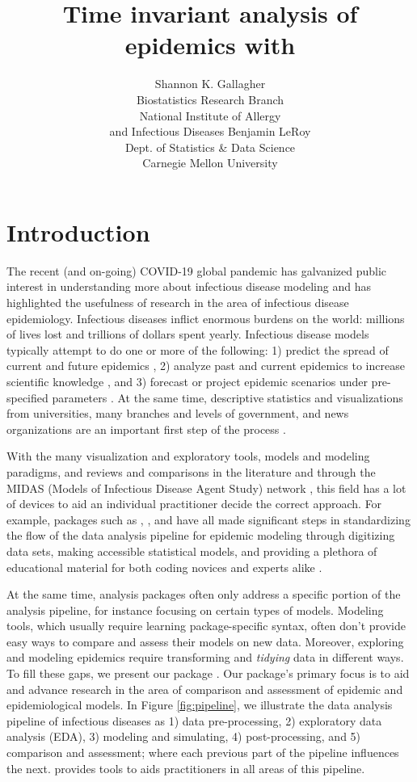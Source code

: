 \documentclass[
  shortnames]{jss}
\author{
Shannon K. Gallagher\\Biostatistics Research Branch\\
National Institute of Allergy\\
and Infectious Diseases \And Benjamin LeRoy\\Dept. of Statistics \& Data Science\\
Carnegie Mellon University
}
\title{Time invariant analysis of epidemics with \pkg{EpiCompare}}
\begin{document}
\newcommand{\shannon}[1]{\textcolor{orange}{#1}}
\newcommand{\ben}[1]{\textcolor{violet}{#1}}

\newtheorem{theorem}{Theorem}

\section[Intro]{Introduction}\label{sec:intro}

The recent (and on-going) COVID-19 global pandemic has galvanized public
interest in understanding more about infectious disease modeling and has
highlighted the usefulness of research in the area of infectious disease
epidemiology. Infectious diseases inflict enormous burdens on the world:
millions of lives lost and trillions of dollars spent yearly. Infectious
disease models typically attempt to do one or more of the following: 1)
predict the spread of current and future epidemics
\citep[e.g. flu prediction][]{Biggerstaff2016}, 2) analyze past and
current epidemics to increase scientific knowledge
\citep[e.g. historical measle outbreaks][]{Neal2004}, and 3) forecast or
project epidemic scenarios under pre-specified parameters
\citep[e.g.][]{ferguson2020}. At the same time, descriptive statistics
and visualizations from universities, many branches and levels of
government, and news organizations are an important first step of the
process \citep{dong2020,cdc-covid-tracker2021,wp-covid-tracker2021} .

With the many visualization and exploratory tools, models and modeling
paradigms, and reviews and comparisons in the literature and through the
MIDAS (Models of Infectious Disease Agent Study) network
\citep{midasnetwork2021}, this field has a lot of devices to aid an
individual practitioner decide the correct approach. For
example, packages such as ,
, and  have all made significant steps in
standardizing the flow of the data analysis pipeline for epidemic
modeling through digitizing data sets, making accessible statistical
models, and providing a plethora of educational material for both coding
novices and experts alike \citep{surveillance2017,Jenness2018,King2016}.

At the same time, analysis packages often only address a specific
portion of the analysis pipeline, for instance focusing on certain types
of models. Modeling tools, which usually require learning
package-specific syntax, often don't provide easy ways to compare and
assess their models on new data. Moreover, exploring and modeling
epidemics require transforming and \textit{tidying} data in different
ways. To fill these gaps, we present our  package
. Our package's primary focus is to aid and advance
research in the area of comparison and assessment of epidemic and
epidemiological models. In Figure \ref{fig:pipeline}, we illustrate the
data analysis pipeline of infectious diseases as 1) data pre-processing,
2) exploratory data analysis (EDA), 3) modeling and simulating, 4)
post-processing, and 5) comparison and assessment; where each previous
part of the pipeline influences the next.  provides
tools to aids practitioners in all areas of this pipeline.
\end{document}
